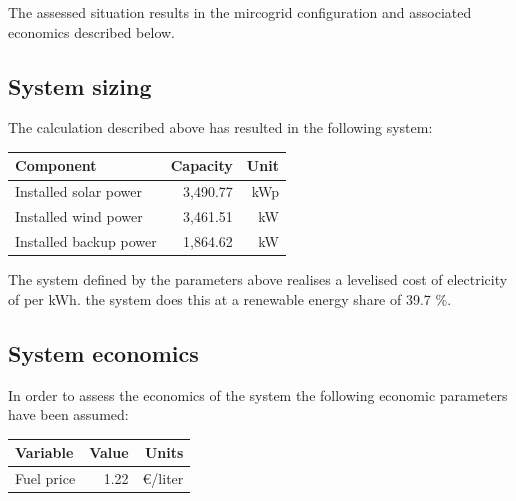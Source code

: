 \documentclass{article}[11pt]
\begin{document}
\begin{multicols}{2}
The assessed situation results in the mircogrid configuration and associated economics described below.

\subsection*{System sizing}

The calculation described above has resulted in the following system:

{\color{black}\begin{flushleft}

\begin{tabular}{|l|r|r|}

\hline Component&Capacity&Unit\\ \hline 

Installed solar power&3,490.77&kWp\\ 

Installed wind power&3,461.51&kW\\ 

Installed backup power&1,864.62&kW\\ 

\hline

\end{tabular}

\label{tab:systemlayout}

\end{flushleft}}\vspace{0.5mm}

The system defined by the parameters above realises a levelised cost of electricity of  per kWh. the system does this at a renewable energy share of 39.7 \%. 

\subsection*{System economics}

In order to assess the economics of the system the following economic parameters have been assumed: 

{\color{black}\begin{flushleft}

\begin{tabular}{|l|r|r|}

\hline Variable&Value&Units\\ \hline 

Fuel price&1.22&\euro /liter\\ 


\end{tabular}
\end{flushleft}}
\end{multicols}
\end{document}
